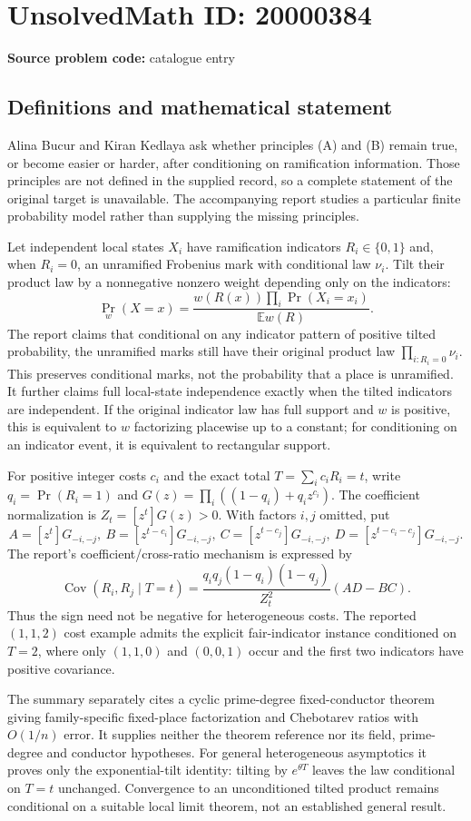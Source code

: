 \documentclass[11pt]{article}
\newcommand{\E}{\mathbb{E}}
\begin{document}
\section*{UnsolvedMath ID: 20000384}
\textbf{Source problem code:} catalogue entry
\subsection{Definitions and mathematical statement}
Alina Bucur and Kiran Kedlaya ask whether principles (A) and (B) remain true, or become easier or harder, after conditioning on ramification information. Those principles are not defined in the supplied record, so a complete statement of the original target is unavailable. The accompanying report studies a particular finite probability model rather than supplying the missing principles.

Let independent local states $X_i$ have ramification indicators $R_i\in\{0,1\}$ and, when $R_i=0$, an unramified Frobenius mark with conditional law $\nu_i$. Tilt their product law by a nonnegative nonzero weight depending only on the indicators:
\[
 \Pr_w(X=x)=\frac{w(R(x))\prod_i\Pr(X_i=x_i)}{\E w(R)}.
\]
The report claims that conditional on any indicator pattern of positive tilted probability, the unramified marks still have their original product law $\prod_{i:R_i=0}\nu_i$. This preserves conditional marks, not the probability that a place is unramified. It further claims full local-state independence exactly when the tilted indicators are independent. If the original indicator law has full support and $w$ is positive, this is equivalent to $w$ factorizing placewise up to a constant; for conditioning on an indicator event, it is equivalent to rectangular support.

For positive integer costs $c_i$ and the exact total $T=\sum_i c_iR_i=t$, write $q_i=\Pr(R_i=1)$ and $G(z)=\prod_i((1-q_i)+q_i z^{c_i})$. The coefficient normalization is $Z_t=[z^t]G(z)>0$. With factors $i,j$ omitted, put
\[
 A=[z^t]G_{-i,-j},\ B=[z^{t-c_i}]G_{-i,-j},\
 C=[z^{t-c_j}]G_{-i,-j},\ D=[z^{t-c_i-c_j}]G_{-i,-j}.
\]
The report's coefficient/cross-ratio mechanism is expressed by
\[
 \operatorname{Cov}(R_i,R_j\mid T=t)=
 \frac{q_iq_j(1-q_i)(1-q_j)}{Z_t^2}(AD-BC).
\]
Thus the sign need not be negative for heterogeneous costs. The reported $(1,1,2)$ cost example admits the explicit fair-indicator instance conditioned on $T=2$, where only $(1,1,0)$ and $(0,0,1)$ occur and the first two indicators have positive covariance.

The summary separately cites a cyclic prime-degree fixed-conductor theorem giving family-specific fixed-place factorization and Chebotarev ratios with $O(1/n)$ error. It supplies neither the theorem reference nor its field, prime-degree and conductor hypotheses. For general heterogeneous asymptotics it proves only the exponential-tilt identity: tilting by $e^{\theta T}$ leaves the law conditional on $T=t$ unchanged. Convergence to an unconditioned tilted product remains conditional on a suitable local limit theorem, not an established general result.
\end{document}
